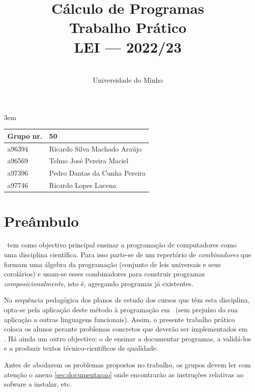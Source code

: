 \documentclass[a4paper]{article}
\title{
          \textbf{Cálculo de Programas}
\\
          Trabalho Prático
\\
          LEI --- 2022/23
}
\author{
          \dium
\\
          Universidade do Minho
}
\date\mydate
\begin{document}
\emergencystretch 3em

\maketitle

\begin{center}\large
\begin{tabular}{ll}
Grupo nr. & 50
\\\hline
a96394 & Ricardo Silva Machado Araújo
\\
a96569 & Telmo José Pereira Maciel 
\\
a97396 & Pedro Dantas da Cunha Pereira 
\\
a97746 & Ricardo Lopes Lucena 
\end{tabular}
\end{center}

\section*{Preâmbulo}

\CP\ tem como objectivo principal ensinar
a progra\-mação de computadores como uma disciplina científica. Para isso
parte-se de um repertório de \emph{combinadores} que formam uma álgebra da
programação (conjunto de leis universais e seus corolários) e usam-se esses
combinadores para construir programas \emph{composicionalmente}, isto é,
agregando programas já existentes.

Na sequência pedagógica dos planos de estudo dos cursos que têm
esta disciplina, opta-se pela aplicação deste método à programação
em \Haskell\ (sem prejuízo da sua aplicação a outras linguagens
funcionais). Assim, o presente trabalho prático coloca os
alunos perante problemas concretos que deverão ser implementados em
\Haskell.  Há ainda um outro objectivo: o de ensinar a documentar
programas, a validá-los e a produzir textos técnico-científicos de
qualidade.

Antes de abodarem os problemas propostos no trabalho, os grupos devem ler
com atenção o anexo \ref{sec:documentacao} onde encontrarão as instruções
relativas ao sofware a instalar, etc.
\end{document}
